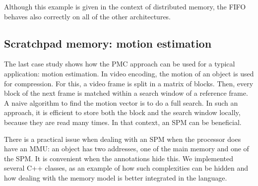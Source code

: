 Although this example is given in the context of distributed memory, the \ac{FIFO} behaves also correctly on all of the other architectures.

\subsection{Scratchpad memory: motion estimation}
\label{s:memory:case_study:spm}

The last case study shows how the \ac{PMC} approach can be used for a typical  application: motion estimation.
In video encoding, the motion of an object is used for compression.
For this, a video frame is split in a matrix of blocks.
Then, every block of the next frame is matched within a search window of a reference frame.
A naive algorithm to find the motion vector is to do a full search.
In such an approach, it is efficient to store both the block and the search window locally, because they are read many times.
In that context, an \ac{SPM} can be beneficial.

There is a practical issue when dealing with an \ac{SPM} when the processor does have an \ac{MMU}: an object has two addresses, one of the main memory and one of the \ac{SPM}.
It is convenient when the annotations hide this.
We implemented several C++ classes, as an example of how such complexities can be hidden and how dealing with the memory model is better integrated in the language.


